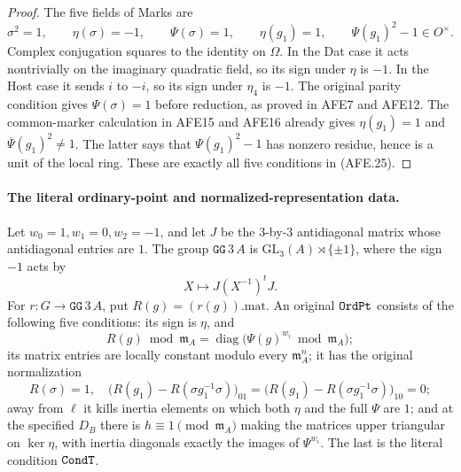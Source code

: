 \documentclass[11pt,a4paper]{article}
\numberwithin{equation}{section}
\theoremstyle{remark}\newtheorem{remark}[theorem]{Remark}
\begin{document}
\begin{proof}
The five fields of Marks are
\[
 \sigma^2=1,\qquad \eta(\sigma)=-1,\qquad
 \Psi(\sigma)=1,\qquad \eta(g_1)=1,\qquad
                         \Psi(g_1)^2-1\in O^\times.
                                                        \tag{AFE.25}
\]
Complex conjugation squares to the identity on
\(\Omega\).
In the Dat case it acts nontrivially on the imaginary
quadratic field, so its sign under \(\eta\) is \(-1\).
In the Host case it sends \(i\) to \(-i\), so its
sign under \(\eta_4\) is \(-1\).
The original parity condition gives
\(\Psi(\sigma)=1\) before reduction, as proved in
AFE7 and AFE12.
The common-marker calculation in AFE15 and AFE16
already gives
\(\eta(g_1)=1\) and \(\overline\Psi(g_1)^2\ne1\).
The latter says that \(\Psi(g_1)^2-1\) has nonzero
residue, hence is a unit of the local ring.
These are exactly all five conditions in (AFE.25).
\end{proof}

\paragraph{The literal ordinary-point and normalized-representation data.}
Let \(w_0=1,w_1=0,w_2=-1\), and let
\(J\) be the \(3\)-by-\(3\) antidiagonal matrix
whose antidiagonal entries are \(1\).
The group \(\texttt{GG}\,3\,A\) is
\(\mathrm{GL}_3(A)\rtimes\{\pm1\}\), where the sign
\(-1\) acts by
\[
                         X\longmapsto J(X^{-1})^tJ.
 \]
For \(r:G\to\texttt{GG}\,3\,A\), put \(R(g)=(r(g)).\mathrm{mat}\).
An original \(\texttt{Ord\allowbreak Pt}\) consists of the following
five conditions: its sign is \(\eta\), and
\[
 R(g)\bmod\mathfrak m_A
   =\operatorname{diag}\bigl(\Psi(g)^{w_i}\bmod\mathfrak m_A\bigr);
 \]
its matrix entries are locally constant modulo every
\(\mathfrak m_A^n\); it has the original normalization
\[
 R(\sigma)=1,\quad
 \bigl(R(g_1)-R(\sigma g_1^{-1}\sigma)\bigr)_{01}
 =\bigl(R(g_1)-R(\sigma g_1^{-1}\sigma)\bigr)_{10}=0;
                                                        \tag{AFE.26}
\]
away from \(\ell\) it kills inertia elements on which
both \(\eta\) and the full \(\Psi\) are \(1\);
and at the specified \(D_B\) there is \(h\equiv1
\pmod{\mathfrak m_A}\) making the matrices upper
triangular on \(\ker\eta\), with inertia diagonals
exactly the images of \(\Psi^{w_i}\).
The last is the literal condition \(\texttt{Cond\allowbreak T}\).
\end{document}
